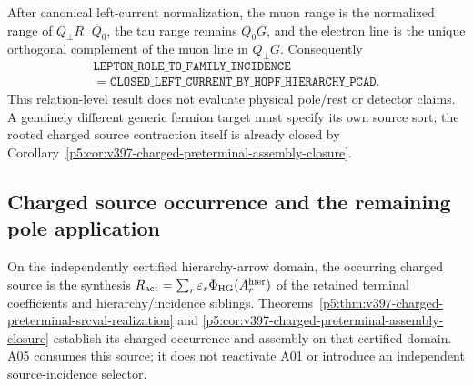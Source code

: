 \documentclass[12pt,a4paper]{article}
\begin{document}
\begin{corollary}
\label{p5:cor:v3108-lepton-incidence-status}
After canonical left-current normalization, the muon range is the normalized
range of $Q_\perp R_-Q_0$, the tau range remains $Q_0G$, and the electron line
is the unique orthogonal complement of the muon line in $Q_\perp G$.
Consequently
\[
 \boxed{\begin{gathered}
 \texttt{LEPTON\_ROLE\_TO\_FAMILY\_INCIDENCE}\\
 =\texttt{CLOSED\_LEFT\_CURRENT\_BY\_HOPF\_HIERARCHY\_PCAD}.
 \end{gathered}}
\]
This relation-level result does not evaluate physical pole/rest or detector
claims. A genuinely different generic fermion target must specify its own
source sort; the rooted charged source contraction itself is already closed
by Corollary~\ref{p5:cor:v397-charged-preterminal-assembly-closure}.
\end{corollary}



\subsection{Charged source occurrence and the remaining pole application}
\label{p5:sec:v2168-charged-source-application}
On the independently certified hierarchy-arrow domain, the occurring charged source is the synthesis
$R_{\rm act}=\sum_r\varepsilon_r\Phi_{\rm HG}(A_r^{\rm hier})$
of the retained terminal coefficients and hierarchy/incidence siblings.
Theorems~\ref{p5:thm:v397-charged-preterminal-srcval-realization} and
\ref{p5:cor:v397-charged-preterminal-assembly-closure} establish its
charged occurrence and assembly on that certified domain. A05 consumes this source; it does not
reactivate A01 or introduce an independent source-incidence selector.
\end{document}
